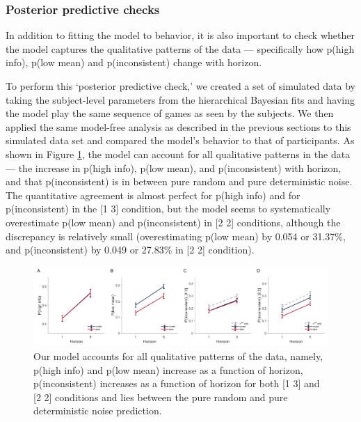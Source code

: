 \documentclass[12pt]{article}
\begin{document}
{\subsubsection*{Posterior predictive checks}
In addition to fitting the model to behavior, it is also important to check whether the model captures the qualitative patterns of the data \citep{Wilson2019} --- specifically how p(high info), p(low mean) and p(inconsistent) change with horizon.

To perform this `posterior predictive check,' we created a set of simulated data by taking the subject-level parameters from the hierarchical Bayesian fits and having the model play the same sequence of games as seen by the subjects. We then applied the same model-free analysis as described in the previous sections to this simulated data set and compared the model's behavior to that of participants. As shown in Figure \ref{fig:mb3}, the model can account for all qualitative patterns in the data --- the increase in p(high info), p(low mean), and p(inconsistent) with horizon, and that p(inconsistent) is in between pure random and pure deterministic noise. The quantitative agreement is almost perfect for p(high info) and for p(inconsistent) in the [1 3] condition, but the model seems to systematically overestimate p(low mean) and p(inconsistent) in [2 2] conditions, although the discrepancy is relatively small (overestimating p(low mean) by 0.054 or 31.37\%, and p(inconsistent) by 0.049 or 27.83\% in [2 2] condition).

\begin{figure}[H]
\begin{center}
	\includegraphics[width=1\textwidth]{figures/RDBayes_2noise_modelA.jpg}
	\caption{
		Our model accounts for all qualitative patterns of the data, namely, p(high info) and p(low mean) increase as a function of horizon, p(inconsistent) increases as a function of horizon for both [1 3] and [2 2] conditions and lies between the pure random and pure deterministic noise prediction.}
	\label{fig:mb3}
\end{center}
\end{figure}


}
\end{document}
